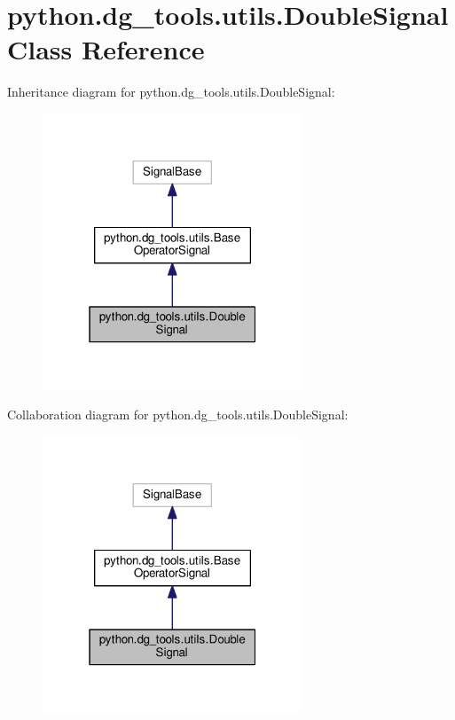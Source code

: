 \hypertarget{classpython_1_1dg__tools_1_1utils_1_1DoubleSignal}{}\section{python.\+dg\+\_\+tools.\+utils.\+Double\+Signal Class Reference}
\label{classpython_1_1dg__tools_1_1utils_1_1DoubleSignal}


Inheritance diagram for python.\+dg\+\_\+tools.\+utils.\+Double\+Signal\+:
\nopagebreak
\begin{figure}[H]
\begin{center}
\leavevmode
\includegraphics[width=220pt]{classpython_1_1dg__tools_1_1utils_1_1DoubleSignal__inherit__graph}
\end{center}
\end{figure}


Collaboration diagram for python.\+dg\+\_\+tools.\+utils.\+Double\+Signal\+:
\nopagebreak
\begin{figure}[H]
\begin{center}
\leavevmode
\includegraphics[width=220pt]{classpython_1_1dg__tools_1_1utils_1_1DoubleSignal__coll__graph}
\end{center}
\end{figure}
